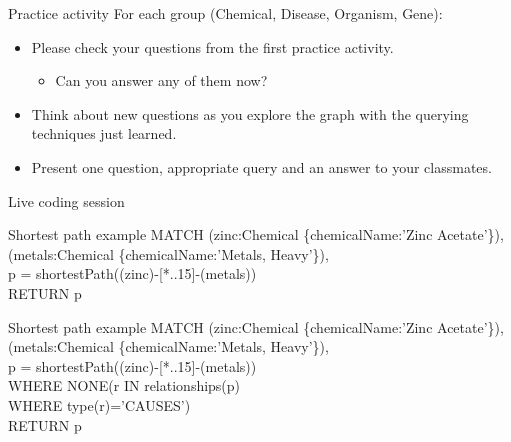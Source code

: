 \documentclass[12pt]{beamer}
\begin{document}
    \begin{frame}{Practice activity}
        For each group (Chemical, Disease, Organism, Gene):
        \begin{itemize}
            \item Please check your questions from the first practice activity.
            \begin{itemize}
                \item Can you answer any of them now?
            \end{itemize}
            \item Think about new questions as you explore the graph with the querying techniques just learned.
            \item Present one question, appropriate query and an answer to your classmates.
        \end{itemize}
    \end{frame}
    
    \begin{frame}{Live coding session}
        \begin{block}{Shortest path example}
            MATCH (zinc:Chemical \{chemicalName:'Zinc Acetate'\}),\\
            \hspace{1cm} (metals:Chemical \{chemicalName:'Metals, Heavy'\}),\\
            \hspace{1cm} p = shortestPath((zinc)-[*..15]-(metals))\\
            RETURN p\\
        \end{block}
        \begin{block}{Shortest path example}
            MATCH (zinc:Chemical \{chemicalName:'Zinc Acetate'\}),\\
            \hspace{1cm} (metals:Chemical \{chemicalName:'Metals, Heavy'\}),\\
            \hspace{1cm} p = shortestPath((zinc)-[*..15]-(metals))\\
            WHERE NONE(r IN relationships(p)\\
            \hspace{2.7cm} WHERE type(r)='CAUSES')\\
            RETURN p\\
        \end{block}
    \end{frame}
    
\end{document}
